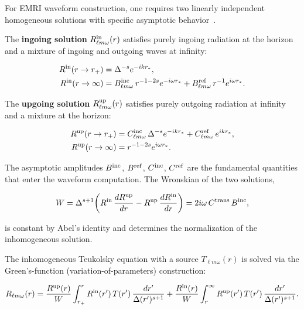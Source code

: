 \documentclass[aps,prd,twocolumn,superscriptaddress,nofootinbib]{revtex4-2}
\begin{document}
For EMRI waveform construction, one requires two linearly independent
homogeneous solutions with specific asymptotic behavior~\cite{Sasaki:2003lr}.

The \textbf{ingoing solution} $R^{\rm in}_{\ell m \omega}(r)$ satisfies purely
ingoing radiation at the horizon and a mixture of ingoing and outgoing waves at
infinity:

\begin{align}
  R^{\rm in}(r \to r_+) &= \Delta^{-s} e^{-i k r_*},
    \label{eq:Rin_horizon} \\
  R^{\rm in}(r \to \infty) &=
    B^{\rm inc}_{\ell m \omega}\, r^{-1-2s} e^{-i \omega r_*}
    + B^{\rm ref}_{\ell m \omega}\, r^{-1} e^{i \omega r_*}.
    \label{eq:Rin_infinity}
\end{align}

The \textbf{upgoing solution} $R^{\rm up}_{\ell m \omega}(r)$ satisfies purely
outgoing radiation at infinity and a mixture at the horizon:

\begin{align}
  R^{\rm up}(r \to r_+) &=
    C^{\rm inc}_{\ell m \omega}\, \Delta^{-s} e^{-i k r_*}
    + C^{\rm ref}_{\ell m \omega}\, e^{i k r_*},
    \label{eq:Rup_horizon} \\
  R^{\rm up}(r \to \infty) &= r^{-1-2s} e^{i \omega r_*}.
    \label{eq:Rup_infinity}
\end{align}

The asymptotic amplitudes $B^{\rm inc}$, $B^{\rm ref}$, $C^{\rm inc}$,
$C^{\rm ref}$ are the fundamental quantities that enter the waveform
computation.  The Wronskian of the two solutions,

\begin{equation}
  W = \Delta^{s+1}\!\left(R^{\rm in}\,\frac{dR^{\rm up}}{dr}
    - R^{\rm up}\,\frac{dR^{\rm in}}{dr}\right)
    = 2 i \omega\, C^{\rm trans}\, B^{\rm inc},
  \label{eq:wronskian}
\end{equation}

is constant by Abel's identity and determines the normalization of the
inhomogeneous solution.

The inhomogeneous Teukolsky equation with a source $T_{\ell m \omega}(r)$ is
solved via the Green's-function (variation-of-parameters) construction:

\begin{equation}
  R_{\ell m \omega}(r) = \frac{R^{\rm up}(r)}{W}
    \int_{r_+}^{r} R^{\rm in}(r')\, T(r')\,
    \frac{dr'}{\Delta(r')^{s+1}}
    + \frac{R^{\rm in}(r)}{W}
    \int_{r}^{\infty} R^{\rm up}(r')\, T(r')\,
    \frac{dr'}{\Delta(r')^{s+1}}.
  \label{eq:green}
\end{equation}
\end{document}
